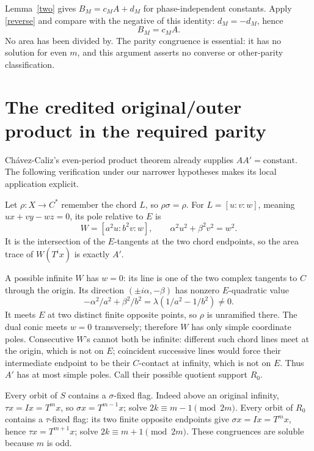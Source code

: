 \documentclass[11pt]{article}
\begin{document}
Lemma~\ref{two} gives \(B_M=c_M A+d_M\) for phase-independent constants.
Apply \eqref{reverse} and compare with the negative of this identity:
\(d_M=-d_M\), hence
\begin{equation}\label{proportional}
 B_M=c_M A .
\end{equation}
No area has been divided by. The parity congruence is essential: it
has no solution for even \(m\), and this argument asserts no converse
or other-parity classification.

\section{The credited original/outer product in the required parity}
\label{aa}
Ch\'avez-Caliz's even-period product theorem \cite[Theorems 3, 6]{chavez}
already supplies \(AA'=\text{constant}\). The following verification
under our narrower hypotheses makes its local application explicit.

Let \(\rho:X\to C^*\) remember the chord \(L\), so \(\rho\sigma=\rho\).
For \(L=[u:v:w]\), meaning \(ux+vy-wz=0\), its pole relative to \(E\) is
\[
 W=[a^2u:b^2v:w],\qquad
 \alpha^2u^2+\beta^2v^2=w^2 .
\]
It is the intersection of the \(E\)-tangents at the two chord endpoints,
so the area trace of \(W(T^i x)\) is exactly \(A'\).

A possible infinite \(W\) has \(w=0\): its line is one of the two complex
tangents to \(C\) through the origin. Its direction
\((\pm i\alpha,-\beta)\) has nonzero \(E\)-quadratic value
\[
 -\alpha^2/a^2+\beta^2/b^2=\lambda(1/a^2-1/b^2)\ne0.
\]
It meets \(E\) at two distinct finite opposite points, so \(\rho\)
is unramified there. The dual conic meets \(w=0\) transversely;
therefore \(W\) has only simple coordinate poles.
Consecutive \(W\)'s cannot both be infinite: different such chord lines
meet at the origin, which is not on \(E\); coincident successive lines
would force their intermediate endpoint to be their \(C\)-contact
at infinity, which is not on \(E\).
Thus \(A'\) has at most simple poles. Call their possible quotient
support \(R_0\).

Every orbit of \(S\) contains a \(\sigma\)-fixed flag. Indeed above
an original infinity, \(\tau x=Ix=T^m x\), so
\(\sigma x=T^{m-1}x\); solve \(2k\equiv m-1\pmod{2m}\).
Every orbit of \(R_0\) contains a \(\tau\)-fixed flag:
its two finite opposite endpoints give \(\sigma x=Ix=T^mx\),
hence \(\tau x=T^{m+1}x\); solve \(2k\equiv m+1\pmod{2m}\).
These congruences are soluble because \(m\) is odd.
\end{document}
